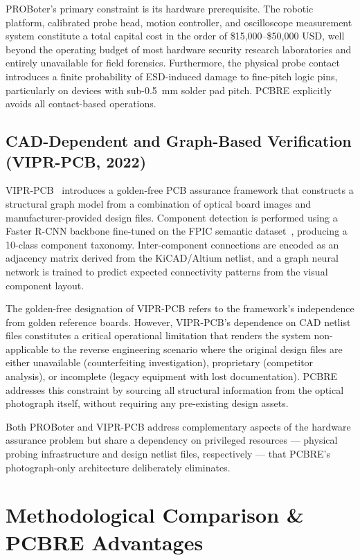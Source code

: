 \documentclass[12pt,a4paper]{report}
\begin{document}
PROBoter's primary constraint is its hardware prerequisite. The robotic platform, calibrated probe head, motion controller, and oscilloscope measurement system constitute a total capital cost in the order of \$15,000--\$50,000 USD, well beyond the operating budget of most hardware security research laboratories and entirely unavailable for field forensics. Furthermore, the physical probe contact introduces a finite probability of ESD-induced damage to fine-pitch logic pins, particularly on devices with sub-0.5~mm solder pad pitch. PCBRE explicitly avoids all contact-based operations.

\subsection{CAD-Dependent and Graph-Based Verification (VIPR-PCB, 2022)}
\label{subsec:vipr_pcb}

VIPR-PCB~\cite{bhattacharyay2022vipr} introduces a golden-free PCB assurance framework that constructs a structural graph model from a combination of optical board images and manufacturer-provided design files. Component detection is performed using a Faster R-CNN backbone fine-tuned on the FPIC semantic dataset~\cite{jessurun2023fpic}, producing a 10-class component taxonomy. Inter-component connections are encoded as an adjacency matrix derived from the KiCAD/Altium netlist, and a graph neural network is trained to predict expected connectivity patterns from the visual component layout.

The golden-free designation of VIPR-PCB refers to the framework's independence from golden reference boards. However, VIPR-PCB's dependence on CAD netlist files constitutes a critical operational limitation that renders the system non-applicable to the reverse engineering scenario where the original design files are either unavailable (counterfeiting investigation), proprietary (competitor analysis), or incomplete (legacy equipment with lost documentation). PCBRE addresses this constraint by sourcing all structural information from the optical photograph itself, without requiring any pre-existing design assets.

Both PROBoter and VIPR-PCB address complementary aspects of the hardware assurance problem but share a dependency on privileged resources --- physical probing infrastructure and design netlist files, respectively --- that PCBRE's photograph-only architecture deliberately eliminates.

\section{Methodological Comparison \& PCBRE Advantages}
\label{sec:comparative_summary}
\end{document}
